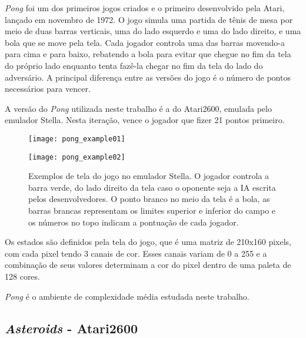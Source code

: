 \textit{Pong} foi um dos primeiros jogos criados e o primeiro desenvolvido pela Atari, lançado em novembro de 1972.
O jogo simula uma partida de tênis de mesa por meio de duas barras verticais, uma do lado esquerdo e uma do lado direito, e uma bola que se move pela tela.
Cada jogador controla uma das barras movendo-a para cima e para baixo, rebatendo a bola para evitar que chegue no fim da tela do próprio lado enquanto tenta fazê-la chegar no fim da tela do lado do adversário.
A principal diferença entre as versões do jogo é o número de pontos necessários para vencer.

A versão do \textit{Pong} utilizada neste trabalho é a do Atari2600, emulada pelo emulador Stella.
Nesta iteração, vence o jogador que fizer 21 pontos primeiro.

\begin{figure}[h!]
  \begin{minipage}[b]{.5\textwidth}
  \centering
  \texttt{[image: pong\_example01]}
  \end{minipage}
  \hfill
  \begin{minipage}[b]{.5\textwidth}
  \texttt{[image: pong\_example02]}
  \end{minipage}
  \caption{Exemplos de tela do jogo no emulador Stella. O jogador controla a barra verde, do lado direito da tela caso o oponente seja a IA escrita pelos desenvolvedores. O ponto branco no meio da tela é a bola, as barras brancas representam os limites superior e inferior do campo e os números no topo indicam a pontuação de cada jogador.}
\end{figure}

Os estados são definidos pela tela do jogo, que é uma matriz de 210x160 pixels, com cada pixel tendo 3 canais de cor.
Esses canais variam de 0 a 255 e a combinação de seus valores determinam a cor do pixel dentro de uma paleta de 128 cores.

\textit{Pong} é o ambiente de complexidade média estudada neste trabalho.

\subsection{\textit{Asteroids} - Atari2600}
\label{sec:asteroids}

